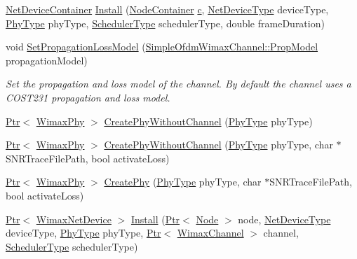 \begin{DoxyCompactItemize}
\item 
\hyperlink{classns3_1_1NetDeviceContainer}{Net\+Device\+Container} \hyperlink{classns3_1_1WimaxHelper_aa458621ecda2b3b36c84fff92c65ca2d}{Install} (\hyperlink{classns3_1_1NodeContainer}{Node\+Container} \hyperlink{mmwave_2model_2fading-traces_2fading__trace__generator_8m_ae0323a9039add2978bf5b49550572c7c}{c}, \hyperlink{classns3_1_1WimaxHelper_a2c8fd9211cf4d7605e506b7c983d78fc}{Net\+Device\+Type} device\+Type, \hyperlink{classns3_1_1WimaxHelper_a42439a8e9f959fd3f5bdf698d248f71a}{Phy\+Type} phy\+Type, \hyperlink{classns3_1_1WimaxHelper_a27a40a8f601900126156781c2ca79406}{Scheduler\+Type} scheduler\+Type, double frame\+Duration)
\item 
void \hyperlink{classns3_1_1WimaxHelper_a3df2c6a33067880b30821b3b7429318c}{Set\+Propagation\+Loss\+Model} (\hyperlink{classns3_1_1SimpleOfdmWimaxChannel_ad8299e6adf4848b1cf213df963e94842}{Simple\+Ofdm\+Wimax\+Channel\+::\+Prop\+Model} propagation\+Model)
\begin{DoxyCompactList}\small\item\em Set the propagation and loss model of the channel. By default the channel uses a C\+O\+S\+T231 propagation and loss model. \end{DoxyCompactList}\item 
\hyperlink{classns3_1_1Ptr}{Ptr}$<$ \hyperlink{classns3_1_1WimaxPhy}{Wimax\+Phy} $>$ \hyperlink{classns3_1_1WimaxHelper_a2df0761a458376b6e2e1ad4ebb471697}{Create\+Phy\+Without\+Channel} (\hyperlink{classns3_1_1WimaxHelper_a42439a8e9f959fd3f5bdf698d248f71a}{Phy\+Type} phy\+Type)
\item 
\hyperlink{classns3_1_1Ptr}{Ptr}$<$ \hyperlink{classns3_1_1WimaxPhy}{Wimax\+Phy} $>$ \hyperlink{classns3_1_1WimaxHelper_a7af6ff977c91993a1fc1079c2801b4fe}{Create\+Phy\+Without\+Channel} (\hyperlink{classns3_1_1WimaxHelper_a42439a8e9f959fd3f5bdf698d248f71a}{Phy\+Type} phy\+Type, char $\ast$S\+N\+R\+Trace\+File\+Path, bool activate\+Loss)
\item 
\hyperlink{classns3_1_1Ptr}{Ptr}$<$ \hyperlink{classns3_1_1WimaxPhy}{Wimax\+Phy} $>$ \hyperlink{classns3_1_1WimaxHelper_ac6e585aea15cb87613b60b4e7a20b6ca}{Create\+Phy} (\hyperlink{classns3_1_1WimaxHelper_a42439a8e9f959fd3f5bdf698d248f71a}{Phy\+Type} phy\+Type, char $\ast$S\+N\+R\+Trace\+File\+Path, bool activate\+Loss)
\item 
\hyperlink{classns3_1_1Ptr}{Ptr}$<$ \hyperlink{classns3_1_1WimaxNetDevice}{Wimax\+Net\+Device} $>$ \hyperlink{classns3_1_1WimaxHelper_acf963b04d7d91b05e268d73837fd1823}{Install} (\hyperlink{classns3_1_1Ptr}{Ptr}$<$ \hyperlink{classns3_1_1Node}{Node} $>$ node, \hyperlink{classns3_1_1WimaxHelper_a2c8fd9211cf4d7605e506b7c983d78fc}{Net\+Device\+Type} device\+Type, \hyperlink{classns3_1_1WimaxHelper_a42439a8e9f959fd3f5bdf698d248f71a}{Phy\+Type} phy\+Type, \hyperlink{classns3_1_1Ptr}{Ptr}$<$ \hyperlink{classns3_1_1WimaxChannel}{Wimax\+Channel} $>$ channel, \hyperlink{classns3_1_1WimaxHelper_a27a40a8f601900126156781c2ca79406}{Scheduler\+Type} scheduler\+Type)

\end{DoxyCompactItemize}
